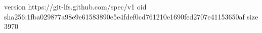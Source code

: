 version https://git-lfs.github.com/spec/v1
oid sha256:1fba029877a98e9e61583890e5e4fdef0cd761210e1690fed2707e41153650af
size 3970
